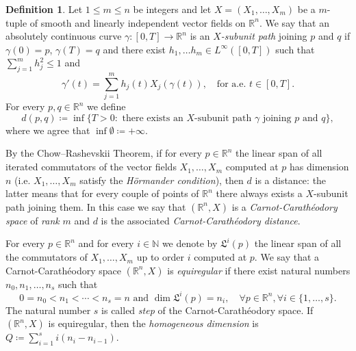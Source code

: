 \documentclass[12pt,a4paper]{amsart}
\theoremstyle{definition}
\newtheorem{defi}{Definition}[section]
\theoremstyle{plain}
\newcommand{\N}{\mathbb{N}}
\newcommand{\R}{\mathbb{R}}
\newcommand{\ceq}{\coloneqq}
\begin{document}
\begin{defi}\label{def_cc}
Let $1\leq m \leq n$ be integers and let $X=(X_1,\dots,X_m)$ be a $m$-tuple of smooth and linearly independent vector fields on $\R^n$. We say that an absolutely continuous curve $\gamma\colon[0,T] \to \R^n$ is an \emph{$X$-subunit path} joining $p$ and $q$ if $\gamma(0)=p$, $\gamma(T)=q$ and there exist $h_1,\dots h_m \in L^\infty([0,T])$ such that $\sum_{j=1}^m h_j^2 \leq 1$ and 
\[
\gamma'(t)=\sum_{j=1}^m h_j(t)X_j(\gamma(t)), \quad \text{for a.e.\ $t\in [0,T]$.}
\]
For every $p,q \in \R^n$ we  define  
\[
d(p,q) \ceq \inf \lbrace T>0: \text{ there exists an $X$-subunit path $\gamma$ joining $p$ and $q$}\rbrace,
\]
where we agree that $\inf \emptyset \ceq +\infty$.

By the Chow–Rashevskii Theorem, if for every $p \in \R^n$ the linear span of all iterated commutators of the vector fields $X_1,\dots, X_m$ computed at $p$ has dimension $n$ (i.e. $X_1,\dots,X_m$ satisfy the \emph{H\"ormander condition}), then $d$ is a distance: the latter means that for every couple of points of $\R^n$ there always exists a $X$-subunit path joining them. In this case we say that $(\R^n,X)$ is a \emph{Carnot-Carathéodory space} of \emph{rank} $m$ and $d$ is the associated \emph{Carnot-Carathéodory distance}.         

For every $p \in \R^n$ and for every $i \in \N$ we denote by $\mathfrak{L}^i(p)$ the linear span of all the commutators of $X_1,\dots,X_m$ up to order $i$ computed at $p$. We say that a Carnot-Carathéodory space $(\R^n,X)$ is \emph{equiregular} if there exist natural numbers $n_0,n_1,\dots,n_s$ such that 
\[
0=n_0<n_1<\cdots<n_s=n \text{ and } \dim  \mathfrak{L}^i(p)=n_i, \quad \forall p \in \R^n, \forall i\in\{1,\dots, s\}.
\]
 The natural number $s$ is called \emph{step} of the Carnot-Carathéodory space. If $(\R^n,X)$ is equiregular, then the \emph{homogeneous dimension} is $Q \ceq \sum_{i=1}^si(n_i-n_{i-1})$.
\end{defi}
\end{document}
